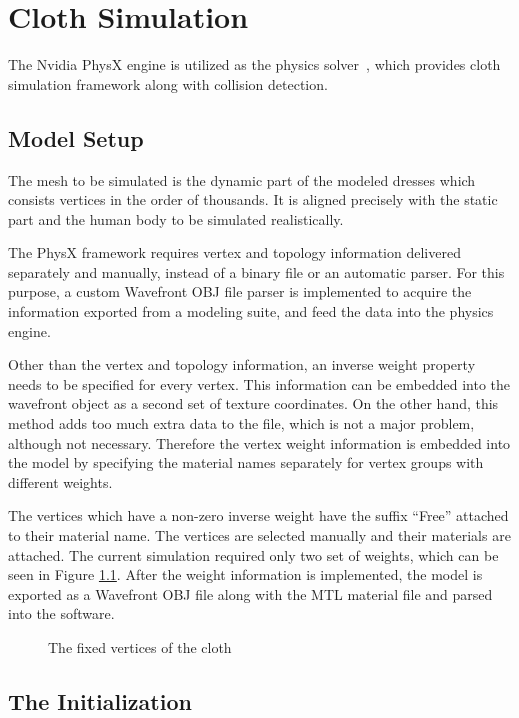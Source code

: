 \chapter{Cloth Simulation}
\label{chapter_cloth_simulation}

The Nvidia PhysX engine is utilized as the physics solver~\cite{Kim2011}, which provides cloth simulation framework along with collision detection. 

\section{Model Setup}
The mesh to be simulated is the dynamic part of the modeled dresses which consists vertices in the order of thousands. It is aligned precisely with the static part and the human body to be simulated realistically. 

The PhysX framework requires vertex and topology information delivered separately and manually, instead of a binary file or an automatic parser. For this purpose, a custom Wavefront OBJ file parser is implemented to acquire the information exported from a modeling suite, and feed the data into the physics engine. 

Other than the vertex and topology information, an inverse weight property needs to be specified for every vertex.  This information can be embedded into the wavefront object as a second set of texture coordinates. On the other hand, this method adds too much extra data to the file, which is not a major problem, although not necessary. Therefore the vertex weight information is embedded into the model by specifying the material names separately for vertex groups with different weights. 

The vertices which have a non-zero inverse weight have the suffix ``Free'' attached to their material name. The vertices are selected manually and their materials are attached.  The current simulation required only two set of weights, which can be seen in Figure \ref{fig:cloth_fixed_vertices}. After the weight information is implemented, the model is exported as a Wavefront OBJ file along with the MTL material file and parsed into the software.

\begin{figure}[h]
\centerline{}
\caption{The fixed vertices of the cloth}
\label{fig:cloth_fixed_vertices}
\end{figure}

\section{The Initialization}

